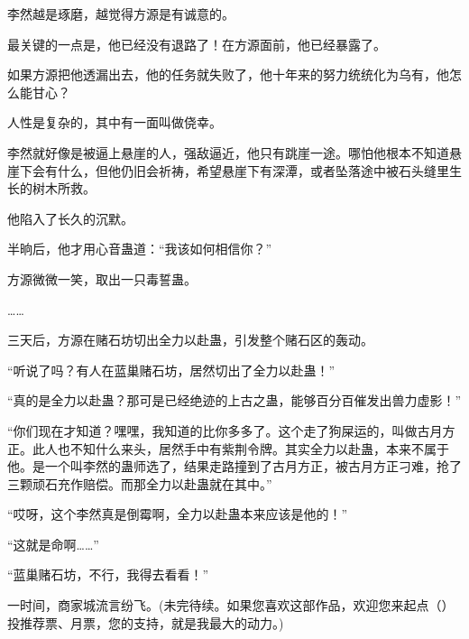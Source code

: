 \begin{this_body}
李然越是琢磨，越觉得方源是有诚意的。

最关键的一点是，他已经没有退路了！在方源面前，他已经暴露了。

如果方源把他透漏出去，他的任务就失败了，他十年来的努力统统化为乌有，他怎么能甘心？

人性是复杂的，其中有一面叫做侥幸。

李然就好像是被逼上悬崖的人，强敌逼近，他只有跳崖一途。哪怕他根本不知道悬崖下会有什么，但他仍旧会祈祷，希望悬崖下有深潭，或者坠落途中被石头缝里生长的树木所救。

他陷入了长久的沉默。

半晌后，他才用心音蛊道：“我该如何相信你？”

方源微微一笑，取出一只毒誓蛊。

……

三天后，方源在赌石坊切出全力以赴蛊，引发整个赌石区的轰动。

“听说了吗？有人在蓝巢赌石坊，居然切出了全力以赴蛊！”

“真的是全力以赴蛊？那可是已经绝迹的上古之蛊，能够百分百催发出兽力虚影！”

“你们现在才知道？嘿嘿，我知道的比你多多了。这个走了狗屎运的，叫做古月方正。此人也不知什么来头，居然手中有紫荆令牌。其实全力以赴蛊，本来不属于他。是一个叫李然的蛊师选了，结果走路撞到了古月方正，被古月方正刁难，抢了三颗顽石充作赔偿。而那全力以赴蛊就在其中。”

“哎呀，这个李然真是倒霉啊，全力以赴蛊本来应该是他的！”

“这就是命啊……”

“蓝巢赌石坊，不行，我得去看看！”

一时间，商家城流言纷飞。(未完待续。如果您喜欢这部作品，欢迎您来起点（）投推荐票、月票，您的支持，就是我最大的动力。)

\end{this_body}

